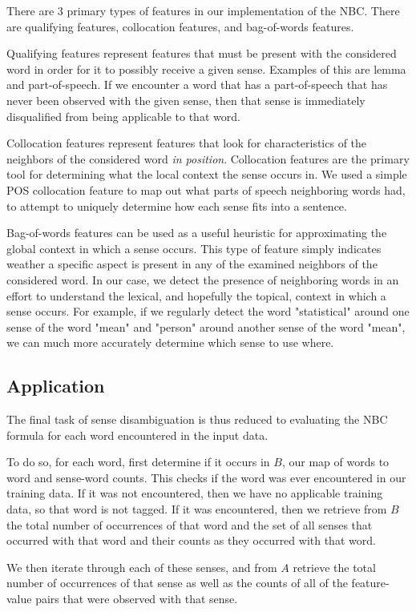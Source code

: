 \documentclass[11pt]{article}
\begin{document}
There are 3 primary types of features in our implementation of the NBC. There are qualifying features, collocation features, and bag-of-words features.

Qualifying features represent features that must be present with the considered word in order for it to possibly receive a given sense. Examples of this are lemma and part-of-speech. If we encounter a word that has a part-of-speech that has never been observed with the given sense, then that sense is immediately disqualified from being applicable to that word.

Collocation features represent features that look for characteristics of the neighbors of the considered word \emph{in position}. Collocation features are the primary tool for determining what the local context the sense occurs in. We used a simple POS collocation feature to map out what parts of speech neighboring words had, to attempt to uniquely determine how each sense fits into a sentence.

Bag-of-words features can be used as a useful heuristic for approximating the global context in which a sense occurs. This type of feature simply indicates weather a specific aspect is present in any of the examined neighbors of the considered word. In our case, we detect the presence of neighboring words in an effort to understand the lexical, and hopefully the topical, context in which a sense occurs. For example, if we regularly detect the word "statistical" around one sense of the word "mean" and "person" around another sense of the word "mean", we can much more accurately determine which sense to use where.

\subsection{Application}
The final task of sense disambiguation is thus reduced to evaluating the NBC formula for each word encountered in the input data.

To do so, for each word, first determine if it occurs in $B$, our map of words to word and sense-word counts. This checks if the word was ever encountered in our training data. If it was not encountered, then we have no applicable training data, so that word is not tagged. If it was encountered, then we retrieve from $B$ the total number of occurrences of that word and the set of all senses that occurred with that word and their counts as they occurred with that word.

We then iterate through each of these senses, and from $A$ retrieve the total number of occurrences of that sense as well as the counts of all of the feature-value pairs that were observed with that sense.
\end{document}
